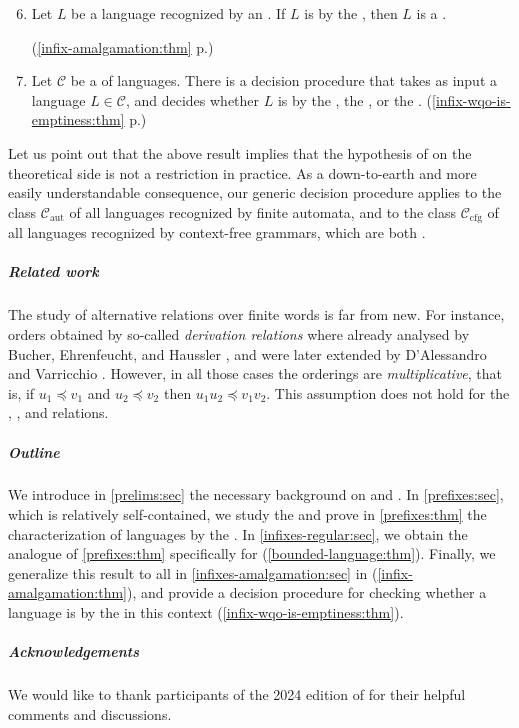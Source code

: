 {
\renewcommand{\labelenumi}{R\arabic{enumi}}
\begin{enumerate}
    \setcounter{enumi}{5}
    \item 
        Let $L$ be a language recognized by an .
        If $L$ is  by the ,
        then $L$ is a .

        \hfill (\cref{infix-amalgamation:thm} p.\pageref{infix-amalgamation:thm})
    \item 
        Let $\mathcal{C}$ be a  of languages.
        There is a decision procedure that takes as input a language $L \in \mathcal{C}$,
        and decides whether $L$ is  by the ,
        the , or the . 
        \hfill (\cref{infix-wqo-is-emptiness:thm} p.\pageref{infix-wqo-is-emptiness:thm})
\end{enumerate}
}
Let us point out that the above result implies that the hypothesis of
 on the theoretical side is not a restriction in
practice. As a down-to-earth and more easily understandable 
consequence,
our generic decision procedure applies 
to the class $\mathcal{C}_\text{aut}$ of all languages recognized by finite automata,
and to the class $\mathcal{C}_\text{cfg}$ of all languages recognized by context-free grammars,
which are both  \cite{aut-cfg-infix:cor}.


\subparagraph{Related work} The study of alternative 
relations over finite words is far from new. For instance, orders obtained by
so-called \emph{derivation relations} where already analysed by Bucher,
Ehrenfeucht, and Haussler \cite{BUEUD85}, and were later extended by
D'Alessandro and Varricchio \cite{ALVA03,ALVA06}. However, in all those cases
the orderings are \emph{multiplicative}, that is, if $u_1 \preceq v_1$ and $u_2
\preceq v_2$ then $u_1u_2 \preceq v_1v_2$. This assumption does not hold for
the , , and  relations.

\subparagraph{Outline} 
We introduce in \cref{prelims:sec} the
necessary background on  and .
In
\cref{prefixes:sec}, which is relatively
self-contained, we study the  and prove in
\cref{prefixes:thm} the characterization of 
languages by the . In
\cref{infixes-regular:sec}, we
obtain the  analogue of \cref{prefixes:thm}
specifically for 
(\cref{bounded-language:thm}). Finally, 
we generalize this result to all
 in \cref{infixes-amalgamation:sec}
in
(\cref{infix-amalgamation:thm}),
and provide a decision procedure for checking whether a language is
 by the  in
this context (\cref{infix-wqo-is-emptiness:thm}).

\subparagraph{Acknowledgements} We would like to thank participants of the 2024
edition of  for their helpful comments and discussions.
